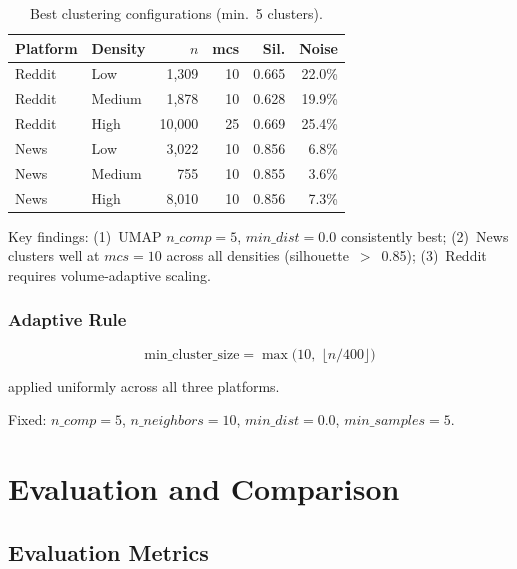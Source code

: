 \documentclass[12pt, a4paper]{article}
\begin{document}
\begin{table}[H]
\centering
\caption{Best clustering configurations (min.\ 5 clusters).}
\label{tab:experiment}
\begin{tabular}{@{}llrrrr@{}}
\toprule
\textbf{Platform} & \textbf{Density} & \textbf{$n$} & \textbf{mcs} & \textbf{Sil.} & \textbf{Noise} \\
\midrule
Reddit & Low    & 1,309  & 10 & 0.665 & 22.0\% \\
Reddit & Medium & 1,878  & 10 & 0.628 & 19.9\% \\
Reddit & High   & 10,000 & 25 & 0.669 & 25.4\% \\[3pt]
News   & Low    & 3,022  & 10 & 0.856 & 6.8\% \\
News   & Medium & 755    & 10 & 0.855 & 3.6\% \\
News   & High   & 8,010  & 10 & 0.856 & 7.3\% \\
\bottomrule
\end{tabular}
\end{table}

Key findings: (1)~UMAP $n\_comp\!=\!5$, $min\_dist\!=\!0.0$ consistently best; (2)~News clusters well at $mcs\!=\!10$ across all densities (silhouette~$>$~0.85); (3)~Reddit requires volume-adaptive scaling.

\subsubsection{Adaptive Rule}

\begin{equation}
\text{min\_cluster\_size} = \max\!\bigl(10,\; \lfloor n / 400 \rfloor\bigr)
\label{eq:adaptive}
\end{equation}

\noindent applied uniformly across all three platforms.

Fixed: $n\_comp\!=\!5$, $n\_neighbors\!=\!10$, $min\_dist\!=\!0.0$, $min\_samples\!=\!5$.


\section{Evaluation and Comparison}
\label{sec:evaluation}

\subsection{Evaluation Metrics}
\end{document}

